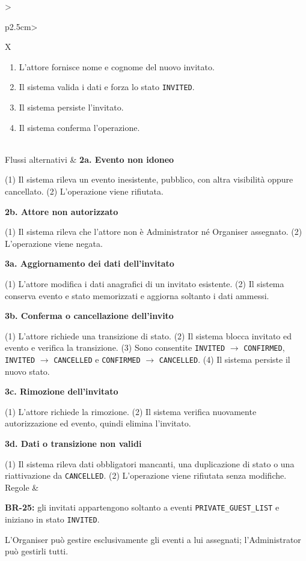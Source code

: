 \begin{tabularx}{\textwidth}{>{\raggedright\arraybackslash\sffamily\bfseries\color{black!75}}p{2.5cm}>{\raggedright\arraybackslash}X}
\begin{minipage}[t]{\linewidth}
\begin{enumerate}[leftmargin=1.4em,nosep,label=\arabic*.]
\item L'attore fornisce nome e cognome del nuovo invitato.
\item Il sistema valida i dati e forza lo stato \texttt{INVITED}.
\item Il sistema persiste l'invitato.
\item Il sistema conferma l'operazione.
\end{enumerate}\vspace{3pt}\end{minipage} \\[2pt] \hline
Flussi alternativi & \textbf{2a. Evento non idoneo} \par (1) Il sistema rileva un evento inesistente, pubblico, con altra visibilità oppure cancellato. (2) L'operazione viene rifiutata. \par\smallskip \textbf{2b. Attore non autorizzato} \par (1) Il sistema rileva che l'attore non è Administrator né Organiser assegnato. (2) L'operazione viene negata. \par\smallskip \textbf{3a. Aggiornamento dei dati dell'invitato} \par (1) L'attore modifica i dati anagrafici di un invitato esistente. (2) Il sistema conserva evento e stato memorizzati e aggiorna soltanto i dati ammessi. \par\smallskip \textbf{3b. Conferma o cancellazione dell'invito} \par (1) L'attore richiede una transizione di stato. (2) Il sistema blocca invitato ed evento e verifica la transizione. (3) Sono consentite \texttt{INVITED} \ensuremath{\rightarrow} \texttt{CONFIRMED}, \texttt{INVITED} \ensuremath{\rightarrow} \texttt{CANCELLED} e \texttt{CONFIRMED} \ensuremath{\rightarrow} \texttt{CANCELLED}. (4) Il sistema persiste il nuovo stato. \par\smallskip \textbf{3c. Rimozione dell'invitato} \par (1) L'attore richiede la rimozione. (2) Il sistema verifica nuovamente autorizzazione ed evento, quindi elimina l'invitato. \par\smallskip \textbf{3d. Dati o transizione non validi} \par (1) Il sistema rileva dati obbligatori mancanti, una duplicazione di stato o una riattivazione da \texttt{CANCELLED}. (2) L'operazione viene rifiutata senza modifiche. \\[2pt] \hline
Regole &\par\smallskip\textbullet{} \textbf{BR-25:} gli invitati appartengono soltanto a eventi \texttt{PRIVATE\_\allowbreak{}GUEST\_\allowbreak{}LIST} e iniziano in stato \texttt{INVITED}.\par\smallskip\textbullet{} L'Organiser può gestire esclusivamente gli eventi a lui assegnati; l'Administrator può gestirli tutti. \\[2pt] \hline

\end{tabularx}
